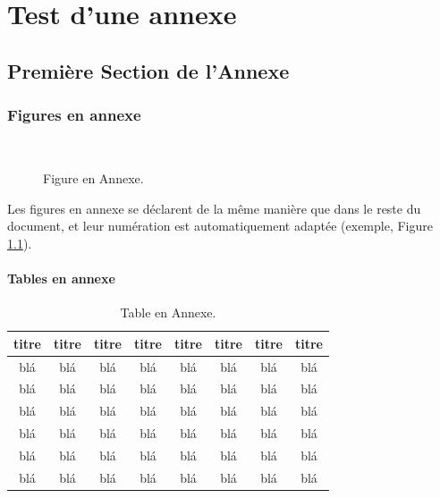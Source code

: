 \documentclass[letterpaper
, twoside
, 12pt
,these
,francais
,creativecommons,hyperref
]{thETS}
\begin{document}
\multiannexe

% 

\chapter{Test d'une annexe}


\section{Première Section de l'Annexe}


\subsection{Figures en annexe}

\begin{figure}
	\centering
	 \\ \parbox{0.75\textwidth}{\caption{Figure en Annexe.}\label{fig:testAp}}
\end{figure}

Les figures en annexe se déclarent de la même manière que dans le reste du document, et leur numération est automatiquement adaptée (exemple, Figure \ref{fig:testAp}).

\subsubsection{Tables en annexe}

\begin{table}
		\parbox{0.65\textwidth}{\caption{Table en Annexe.}\label{tab:testAp}}

		\begin{tabular}{|c|c|c|c|c|c|c|c|}
		\hline
			{\bf titre} & {\bf titre} & {\bf titre} & {\bf titre} & {\bf titre} & {\bf titre} & {\bf titre} & {\bf titre} \\
	  \hline
			blá & blá & blá & blá & blá & blá & blá & blá \\
	  \hline
			blá & blá & blá & blá & blá & blá & blá & blá \\
	  \hline
			blá & blá & blá & blá & blá & blá & blá & blá \\
	  \hline
			blá & blá & blá & blá & blá & blá & blá & blá \\
	  \hline
			blá & blá & blá & blá & blá & blá & blá & blá \\
	  \hline
			blá & blá & blá & blá & blá & blá & blá & blá \\
	  \hline
		\end{tabular}
\end{table}
\end{document}
